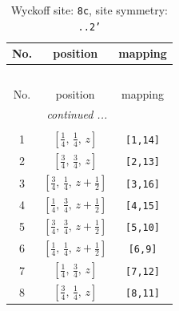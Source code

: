 \documentclass[fleqn,8pt]{jsarticle}
\begin{document}
\renewcommand{\arraystretch}{1.2}
\begin{longtable}{ccc}
\caption{Wyckoff site: {\tt 8c}, site symmetry: {\tt ..2'}}
 \\
 \hline \hline
No. & position & mapping \\ \hline \endfirsthead

\multicolumn{2}{l}{\tablename\ \thetable{}} \\
 \hline \hline
No. & position & mapping \\ \hline \endhead

 \hline \hline
\multicolumn{2}{r}{\footnotesize\it continued ...} \\ \endfoot

 \hline \hline
\multicolumn{2}{r}{} \\ \endlastfoot

1 & $\left[ \frac{1}{4},\, \frac{1}{4},\, z \right]$ & {\tt [1,14]} \\ \hline
2 & $\left[ \frac{3}{4},\, \frac{3}{4},\, z \right]$ & {\tt [2,13]} \\ \hline
3 & $\left[ \frac{3}{4},\, \frac{1}{4},\, z + \frac{1}{2} \right]$ & {\tt [3,16]} \\ \hline
4 & $\left[ \frac{1}{4},\, \frac{3}{4},\, z + \frac{1}{2} \right]$ & {\tt [4,15]} \\ \hline
5 & $\left[ \frac{3}{4},\, \frac{3}{4},\, z + \frac{1}{2} \right]$ & {\tt [5,10]} \\ \hline
6 & $\left[ \frac{1}{4},\, \frac{1}{4},\, z + \frac{1}{2} \right]$ & {\tt [6,9]} \\ \hline
7 & $\left[ \frac{1}{4},\, \frac{3}{4},\, z \right]$ & {\tt [7,12]} \\ \hline
8 & $\left[ \frac{3}{4},\, \frac{1}{4},\, z \right]$ & {\tt [8,11]} \\
\end{longtable}
\renewcommand{\arraystretch}{1.2}
\end{document}
